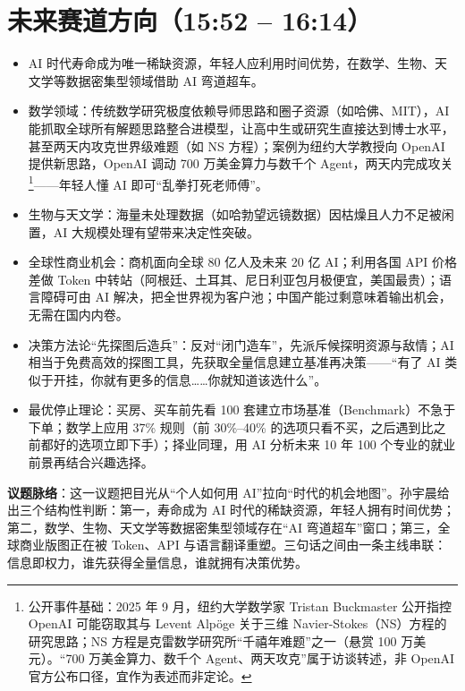\section{未来赛道方向（15:52 --
16:14）}

\begin{itemize}
\tightlist
\item
  AI
  时代寿命成为唯一稀缺资源，年轻人应利用时间优势，在数学、生物、天文学等数据密集型领域借助
  AI 弯道超车。
\item
  数学领域：传统数学研究极度依赖导师思路和圈子资源（如哈佛、MIT），AI
  能抓取全球所有解题思路整合进模型，让高中生或研究生直接达到博士水平，甚至两天内攻克世界级难题（如
  NS 方程）；案例为纽约大学教授向 OpenAI 提供新思路，OpenAI 调动 700
  万美金算力与数千个 Agent，两天内完成攻关\footnote{公开事件基础：2025
    年 9 月，纽约大学数学家 Tristan Buckmaster 公开指控 OpenAI
    可能窃取其与 Levent Alpöge 关于三维
    Navier-Stokes（NS）方程的研究思路；NS
    方程是克雷数学研究所``千禧年难题''之一（悬赏 100 万美元）。``700
    万美金算力、数千个 Agent、两天攻克''属于访谈转述，非 OpenAI
    官方公布口径，宜作为表述而非定论。}------年轻人懂 AI
  即可``乱拳打死老师傅''。
\item
  生物与天文学：海量未处理数据（如哈勃望远镜数据）因枯燥且人力不足被闲置，AI
  大规模处理有望带来决定性突破。
\item
  全球性商业机会：商机面向全球 80 亿人及未来 20 亿 AI；利用各国 API
  价格差做 Token
  中转站（阿根廷、土耳其、尼日利亚包月极便宜，美国最贵）；语言障碍可由
  AI
  解决，把全世界视为客户池；中国产能过剩意味着输出机会，无需在国内内卷。
\item
  决策方法论``先探图后造兵''：反对``闭门造车''，先派斥候探明资源与敌情；AI
  相当于免费高效的探图工具，先获取全量信息建立基准再决策------``有了 AI
  类似于开挂，你就有更多的信息\ldots\ldots 你就知道该选什么''。
\item
  最优停止理论：买房、买车前先看 100
  套建立市场基准（Benchmark）不急于下单；数学上应用 37\% 规则（前
  30\%--40\%
  的选项只看不买，之后遇到比之前都好的选项立即下手）；择业同理，用 AI
  分析未来 10 年 100 个专业的就业前景再结合兴趣选择。
\end{itemize}

\textbf{议题脉络}：这一议题把目光从``个人如何用
AI''拉向``时代的机会地图''。孙宇晨给出三个结构性判断：第一，寿命成为 AI
时代的稀缺资源，年轻人拥有时间优势；第二，数学、生物、天文学等数据密集型领域存在``AI
弯道超车''窗口；第三，全球商业版图正在被 Token、API
与语言翻译重塑。三句话之间由一条主线串联：信息即权力，谁先获得全量信息，谁就拥有决策优势。

